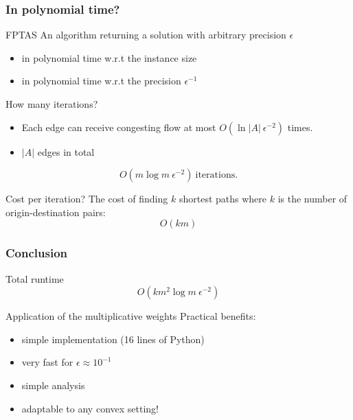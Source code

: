 \documentclass{beamer}
\begin{document}
\begin{frame}
    \frametitle{In polynomial time?}

    \begin{block}{FPTAS}
        An algorithm returning a solution with arbitrary precision $\epsilon$
        \begin{itemize}
            \item in polynomial time w.r.t the instance size
            \item in polynomial time w.r.t the precision $\epsilon^{-1}$
        \end{itemize}
    \end{block}

    \begin{block}{How many iterations?}
        \begin{itemize}
            \item Each edge can receive congesting flow at most
                $O(\ln|A|~\epsilon^{-2})$ times.
            \item $|A|$ edges in total
        \end{itemize}
        \begin{equation*}
        O(m\log m~\epsilon^{-2})~\text{iterations.}
        \end{equation*}
    \end{block}

    \begin{block}{Cost per iteration?}
        The cost of finding $k$ shortest paths where $k$ is the number of
        origin-destination pairs:
        \begin{equation*}
            O(km)
        \end{equation*}
    \end{block}


\end{frame}

\begin{frame}
    \frametitle{Conclusion}

    \begin{block}{Total runtime}
    \begin{equation*}
    O(km^2\log m~\epsilon^{-2})
    \end{equation*}
    \end{block}

    \begin{block}{Application of the multiplicative weights}
        Practical benefits:
        \begin{itemize}
            \item simple implementation (16 lines of Python)
            \item very fast for $\epsilon \approx 10^{-1}$
            \item simple analysis
            \item adaptable to any convex setting!
        \end{itemize}
    \end{block}

\end{frame}
\end{document}
